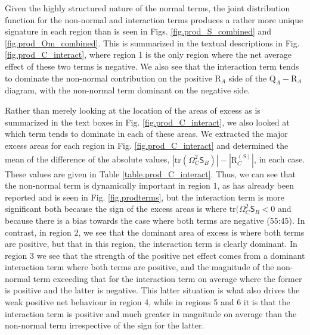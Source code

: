 \documentclass[preprint,amssymb,amsmath,aip,cha]{revtex4-1}
\begin{document}
Given the highly structured nature of the normal terms, the joint distribution function for  the non-normal and interaction terms produces a rather more unique signature in each region than is seen in Figs. \ref{fig.prod_S_combined} and \ref{fig.prod_Om_combined}. This is summarized in the textual descriptions in Fig. \ref{fig.prod_C_interact}, where region 1 is the only region where the net average effect of these two terms is negative. We also see that the interaction term tends to dominate the non-normal contribution on the positive $\mbox{R}_{A}$ side of the $\mbox{Q}_{A}-\mbox{R}_{A}$ diagram, with the non-normal term dominant on the negative side. 

Rather than merely looking at the location of the areas of excess as is summarized in the text boxes in Fig. \ref{fig.prod_C_interact}, we also looked at which term tends to dominate in each of these areas. We extracted the major excess areas for each region in Fig. \ref{fig.prod_C_interact} and determined the mean of the difference of the absolute values, $\overline{|\mbox{tr}(\mathsf{\Omega}^{2}_{C}\mathsf{S}_{B})| - |\mbox{R}_{C}^{(S)}|}$, in each case. These values are given in Table \ref{table.prod_C_interact}. Thus, we can see that the non-normal term is dynamically important in region 1, as has already been reported and is seen in Fig. \ref{fig.prodterms}, but the interaction term is more significant both because the sign of the excess areas is where $\mbox{tr}(\mathsf{\Omega}^{2}_{C}\mathsf{S}_{B} < 0$ and because there is a bias towards the case where both terms are negative (55:45). In contrast, in region 2, we see that the dominant area of excess is where both terms are positive, but that in this region, the interaction term is clearly dominant. In region 3 we see that the strength of the positive net effect comes from a dominant interaction term where both terms are positive, and the magnitude of the  non-normal term exceeding that for the interaction term on average where the former is positive and the latter is negative. This latter situation is what also drives the weak positive net behaviour in region 4, while in regions 5 and 6 it is that the interaction term is positive and much greater in magnitude on average than the non-normal term irrespective of the sign for the latter.
\end{document}

